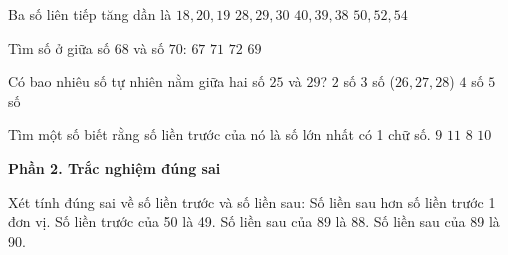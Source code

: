 \begin{ex} %
Ba số liên tiếp tăng dần là
\choice
{$18, 20, 19$}
{\True $28, 29, 30$}
{$40, 39, 38$}
{$50, 52, 54$}
\end{ex}

\begin{ex} %
Tìm số ở giữa số $68$ và số $70$:
\choice
{$67$}
{$71$}
{$72$}
{\True $69$}
\end{ex}

\begin{ex} %
Có bao nhiêu số tự nhiên nằm giữa hai số $25$ và $29$?
\choice
{$2$ số}
{\True $3$ số ($26, 27, 28$)}
{$4$ số}
{$5$ số}
\end{ex}

\begin{ex} %
Tìm một số biết rằng số liền trước của nó là số lớn nhất có 1 chữ số.
\choice
{$9$}
{$11$}
{$8$}
{\True $10$}
\end{ex}

\textbf{Phần 2. Trắc nghiệm đúng sai}

\begin{ex} %
Xét tính đúng sai về số liền trước và số liền sau:
\choiceTF
{\True Số liền sau hơn số liền trước 1 đơn vị.}
{\True Số liền trước của 50 là 49.}
{Số liền sau của 89 là 88.}
{\True Số liền sau của 89 là 90.}
\end{ex}

